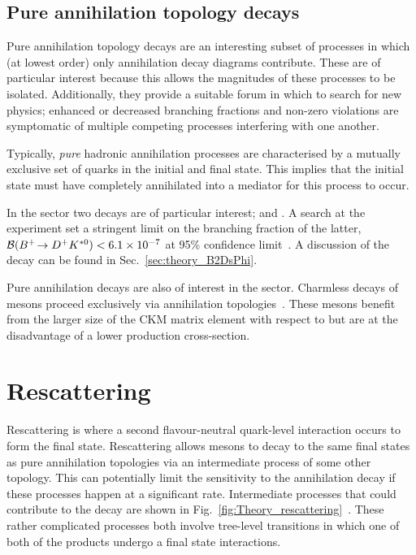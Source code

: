 
\subsection{Pure annihilation topology decays}
Pure annihilation topology decays are an interesting subset of processes in which (at lowest order) only annihilation decay diagrams contribute. These are of particular interest because this allows the magnitudes of these processes to be isolated. Additionally, they provide a suitable forum in which to search for new physics; enhanced or decreased branching fractions and non-zero \CP violations are symptomatic of multiple competing processes interfering with one another.  

Typically, \emph{pure} hadronic annihilation processes are characterised by a mutually exclusive set of quarks in the initial and final state. This implies that the initial state must have completely annihilated into a mediator for this process to occur.   

In the \Bp sector two decays are of particular interest; \decay{\Bp}{\Dsp\phiz} and \decay{\Bp}{\Dp\Kstarz}. A search at the \lhcb experiment set a stringent limit on the branching fraction of the latter, ${\mathcal{B}}({{{B}^+}}\!\rightarrow {\ensuremath{{D}^+}}{\ensuremath{{K}^{*0}}})< 6.1\times10^{-7}$ at 95\% confidence limit~\cite{LHCb-PAPER-2015-054}. A discussion of the \decay{\Bp}{\Dsp\phiz} decay can be found in Sec.~\ref{sec:theory_B2DsPhi}. 

Pure annihilation decays are also of interest in the \Bc sector. Charmless decays of \Bcp mesons proceed exclusively via annihilation topologies~\cite{PhysRevD.80.114031}. These mesons benefit from the larger size of the CKM matrix element \Vcb with respect to \Vub but are at the disadvantage of a lower production cross-section.


\section{Rescattering}
\label{sec:theory_rescattting}
Rescattering is where a second flavour-neutral quark-level interaction occurs to form the final state. 
Rescattering allows \Bp mesons to decay to the same final states as pure annihilation topologies via an intermediate process of some other topology. This can potentially limit the sensitivity to the annihilation decay if these processes happen at a significant rate. Intermediate processes that could contribute to the \decay{\Bp}{\Dsp\phiz} decay are shown in Fig.~\ref{fig:Theory_rescattering}~\cite{Gronau:2012gs}. These rather complicated processes both involve tree-level \decay{\bquarkbar}{\uquarkbar} transitions in which one of both of the products undergo a final state interactions.  

